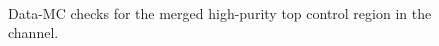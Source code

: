 \begin{figure}[ht]
     \\
    \caption{Data-MC checks for the merged high-purity top control region in the \olep channel.}
    \label{fig:CRTopMerHPPlots1Lep2}
\end{figure}

